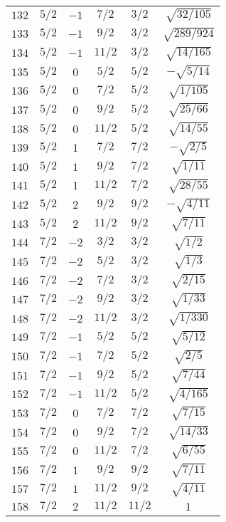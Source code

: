 \begin{table}
\begin{center}
\begin{tabular}{|c|c|c|c|c|c|}
$132$ & $5/2$ & $-1$ & $7/2$ & $3/2$ & $\sqrt{32/105}$ \\ 
$133$ & $5/2$ & $-1$ & $9/2$ & $3/2$ & $\sqrt{289/924}$ \\ 
$134$ & $5/2$ & $-1$ & $11/2$ & $3/2$ & $\sqrt{14/165}$ \\ 
$135$ & $5/2$ & $0$ & $5/2$ & $5/2$ & $-\sqrt{5/14}$ \\ 
$136$ & $5/2$ & $0$ & $7/2$ & $5/2$ & $\sqrt{1/105}$ \\ 
$137$ & $5/2$ & $0$ & $9/2$ & $5/2$ & $\sqrt{25/66}$ \\ 
$138$ & $5/2$ & $0$ & $11/2$ & $5/2$ & $\sqrt{14/55}$ \\ 
$139$ & $5/2$ & $1$ & $7/2$ & $7/2$ & $-\sqrt{2/5}$ \\ 
$140$ & $5/2$ & $1$ & $9/2$ & $7/2$ & $\sqrt{1/11}$ \\ 
$141$ & $5/2$ & $1$ & $11/2$ & $7/2$ & $\sqrt{28/55}$ \\ 
$142$ & $5/2$ & $2$ & $9/2$ & $9/2$ & $-\sqrt{4/11}$ \\ 
$143$ & $5/2$ & $2$ & $11/2$ & $9/2$ & $\sqrt{7/11}$ \\ 
$144$ & $7/2$ & $-2$ & $3/2$ & $3/2$ & $\sqrt{1/2}$ \\ 
$145$ & $7/2$ & $-2$ & $5/2$ & $3/2$ & $\sqrt{1/3}$ \\ 
$146$ & $7/2$ & $-2$ & $7/2$ & $3/2$ & $\sqrt{2/15}$ \\ 
$147$ & $7/2$ & $-2$ & $9/2$ & $3/2$ & $\sqrt{1/33}$ \\ 
$148$ & $7/2$ & $-2$ & $11/2$ & $3/2$ & $\sqrt{1/330}$ \\ 
$149$ & $7/2$ & $-1$ & $5/2$ & $5/2$ & $\sqrt{5/12}$ \\ 
$150$ & $7/2$ & $-1$ & $7/2$ & $5/2$ & $\sqrt{2/5}$ \\ 
$151$ & $7/2$ & $-1$ & $9/2$ & $5/2$ & $\sqrt{7/44}$ \\ 
$152$ & $7/2$ & $-1$ & $11/2$ & $5/2$ & $\sqrt{4/165}$ \\ 
$153$ & $7/2$ & $0$ & $7/2$ & $7/2$ & $\sqrt{7/15}$ \\ 
$154$ & $7/2$ & $0$ & $9/2$ & $7/2$ & $\sqrt{14/33}$ \\ 
$155$ & $7/2$ & $0$ & $11/2$ & $7/2$ & $\sqrt{6/55}$ \\ 
$156$ & $7/2$ & $1$ & $9/2$ & $9/2$ & $\sqrt{7/11}$ \\ 
$157$ & $7/2$ & $1$ & $11/2$ & $9/2$ & $\sqrt{4/11}$ \\ 
$158$ & $7/2$ & $2$ & $11/2$ & $11/2$ & $1$ \\ 
\hline 
\end{tabular}
\end{center}
\end{table}

